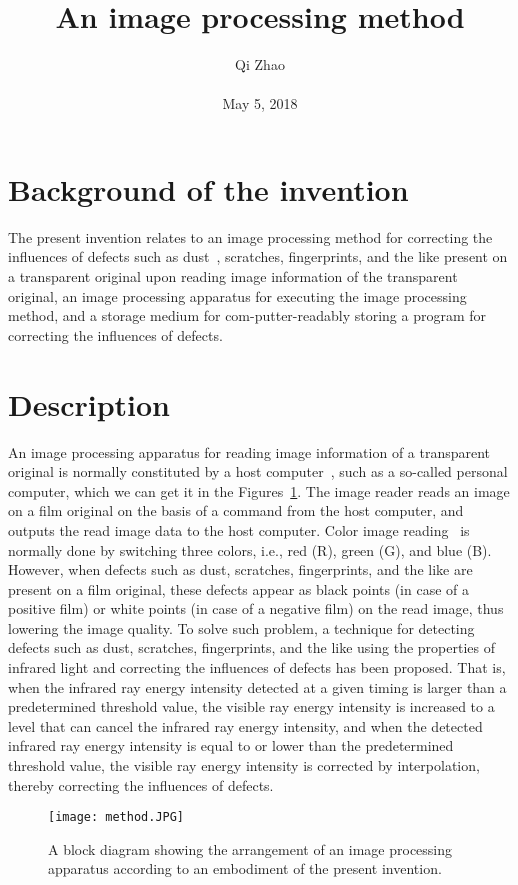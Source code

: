 \documentclass[10pt,twocolumn,letterpaper]{article}
\begin{document}
\title{An image processing method}
\author{Qi Zhao\\\\May 5, 2018}

\maketitle
\section{Background of the invention}
 The present invention relates to an image processing method for correcting the influences of defects such as dust~\cite{Li2012Infrared}, scratches, fingerprints, and the like present on a transparent original upon reading image information of the transparent original, an image processing apparatus for executing the image processing method, and a storage medium for com-putter-readably storing a program for correcting the influences of defects.
\section{Description}
 An image processing apparatus for reading image information of a transparent original is normally constituted by a host computer~\cite{Zou2008Host}, such as a so-called personal computer, which we can get it in the Figures~\ref{fig:onecol}. The image reader reads an image on a film original on the basis of a command from the host computer, and outputs the read image data to the host computer. Color image reading~\cite{Chan1997Reading} is normally done by switching three colors, i.e., red (R), green (G), and blue (B). However, when defects such as dust, scratches, fingerprints, and the like are present on a film original, these defects appear as black points (in case of a positive film) or white points (in case of a negative film) on the read image, thus lowering the image quality. To solve such problem, a technique for detecting defects such as dust, scratches, fingerprints, and the like using the properties of infrared light and correcting the influences of defects has been proposed. That is, when the infrared ray energy intensity detected at a given timing is larger than a predetermined threshold value, the visible ray energy intensity is increased to a level that can cancel the infrared ray energy intensity, and when the detected infrared ray energy intensity is equal to or lower than the predetermined threshold value, the visible ray energy intensity is corrected by interpolation, thereby correcting the influences of defects.
\begin{figure}[t]
\begin{center}

\texttt{[image: method.JPG]}
\end{center}
 \caption{A block diagram showing the arrangement of an image processing apparatus according to an embodiment
of the present invention.}
\label{fig:long}
\label{fig:onecol}
\end{figure}
\end{document}

